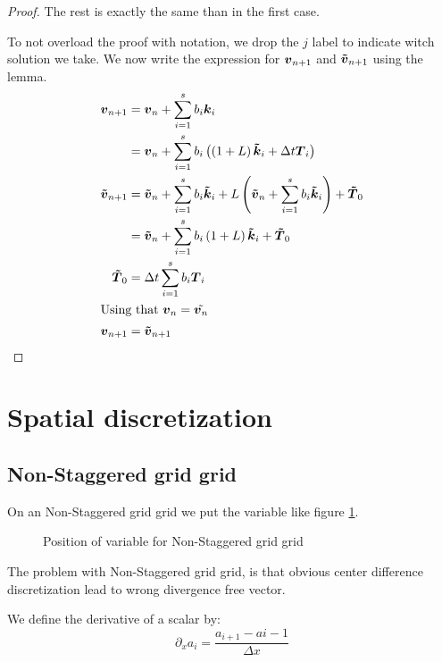 \begin{proof}
The rest is exactly the same than in the first case.

To not overload the proof with notation, we drop the $j$ label to indicate witch solution we take.
We now write the expression for ${\boldsymbol {v}}_{n+1}$ and ${\boldsymbol {\tilde{v}}}_{n+1}$ using the lemma.
\begin{align*}
{\boldsymbol {v}}_{n+1}&={\boldsymbol {v}}_{n}+\sum_{i=1}^{s}b_{i}{\boldsymbol {k}}_{i}\\
&={\boldsymbol {v}}_{n}+\sum_{i=1}^{s}b_{i}\left(\left(1+L\right){\boldsymbol {\tilde{k}}}_i+\Delta t {\boldsymbol {T}}_{i}\right)\\
{\boldsymbol {\tilde{v}}}_{n+1}&={\boldsymbol {\tilde{v}}}_{n}+\sum_{i=1}^{s}b_{i}{\boldsymbol {\tilde{k}}}_{i}+L\left({\boldsymbol {\tilde{v}}}_{n}+\sum_{i=1}^{s}b_{i}{\boldsymbol {\tilde{k}}}_{i}\right)+{\boldsymbol {\tilde{T}}}_0\\
&={\boldsymbol {\tilde{v}}}_{n}+\sum_{i=1}^{s}b_{i}\left(1+L\right){\boldsymbol {\tilde{k}}}_{i}+{\boldsymbol {\tilde{T}}}_0\\
{\boldsymbol {\tilde{T}}}_0&=\Delta t\sum_{i=1}^{s}b_{i}{\boldsymbol {T}}_{i}\\
\intertext{Using that ${\boldsymbol {v}}_{n}=\tilde{{\boldsymbol {v}}_{n}}$}
{\boldsymbol {v}}_{n+1}&={\boldsymbol {\tilde{v}}}_{n+1}
\end{align*}

\end{proof}

\section{Spatial discretization}

\subsection{Non-Staggered grid grid}

On an Non-Staggered grid grid we put the variable like figure \ref{fixed:unstaggered}.

\begin{figure}
\caption{Position of variable for Non-Staggered grid grid}
\label{fixed:unstaggered}
\end{figure}

The problem with Non-Staggered grid grid, is that obvious center difference discretization lead to wrong divergence free vector.

We define the derivative of a scalar by:
\begin{equation}
  \partial_x a_i=\frac{a_{i+1}-a{i-1}}{\Delta x}
\end{equation}

